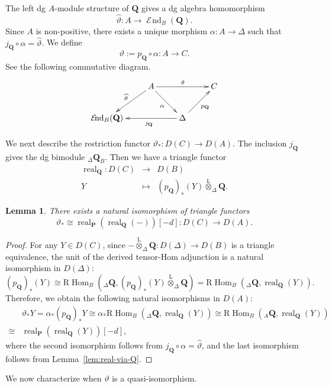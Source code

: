 \documentclass[11pt,a4paper,reqno]{amsart}
\theoremstyle{plain}
\newtheorem{lemma}[theorem]{Lemma}
\numberwithin{equation}{section}
\theoremstyle{definition}
\newcommand{\Hom}{\operatorname{Hom}}
\newcommand{\RHom}{\mathrm R\!\Hom}
\newcommand{\real}{\operatorname{real}}
\newcommand{\Lotimes}{\overset{\mathrm L}{\otimes}}
\DeclareMathOperator{\huaEnd}{\mathcal{E}\!nd}
\newcommand{\PP}{\mathbf{P}}
\newcommand{\QQ}{\mathbf{Q}}
\begin{document}
The left dg $A$-module structure of $\QQ$ gives a dg algebra homomorphism
\[
 \widehat\vartheta\colon A\to\huaEnd_B(\QQ).
\]
Since $A$ is non-positive, there exists a unique morphism $\alpha\colon A\rightarrow\Delta$ such that $j_{\QQ}\circ\alpha=\widehat\vartheta$. We define
\[\vartheta:=p_{\QQ}\circ\alpha\colon A\rightarrow C.\]
See the following commutative diagram.
\[\xymatrix{
  &A\ar[rr]^{\vartheta}\ar[dr]_{\alpha}\ar[dl]_{\widehat\vartheta}&&C\\
  \huaEnd_B(\QQ)&&\Delta\ar[ru]_{p_{\QQ}}\ar[ll]^{\quad j_{\QQ}}
}\]

We next describe the restriction functor $\vartheta_*\colon D(C)\to D(A)$. The inclusion $j_{\QQ}$ gives the dg bimodule ${}_\Delta\QQ_B$. Then we have a triangle functor
\[
\begin{array}{rcl}
  \real_{\QQ}\colon D(C)& \to & D(B)\\
  Y &\mapsto &
      (p_{\QQ})_*(Y)\overset{\mathrm L}{\otimes}_\Delta\QQ.
\end{array}
\]

\begin{lemma}\label{lem:res-varthe}
There exists a natural isomorphism of triangle functors
\[
\vartheta_*\cong\real_{\PP}\left(\real_{\QQ}(-)\right)[-d]\colon D(C)\to D(A).
\]
\end{lemma}

\begin{proof}
For any $Y\in D(C)$, since $-\Lotimes_\Delta\QQ\colon D(\Delta)\to D(B)$ is a triangle equivalence, the unit of the derived tensor-Hom adjunction is a natural isomorphism in $D(\Delta)$:
\[(p_{\QQ})_*(Y)\cong\RHom_B
 \left({}_\Delta\QQ,(p_{\QQ})_*(Y)\overset{\mathrm L}{\otimes}_\Delta\QQ\right)=\RHom_B
 \left({}_\Delta\QQ,\real_{\QQ}(Y)\right).\]
Therefore, we obtain the following natural isomorphisms in $D(A)$:
\[\begin{array}{rl}
  & \vartheta_*Y=\alpha_*(p_{\QQ})_*Y\cong\alpha_*\RHom_B\left({}_\Delta\QQ,\real_{\QQ}(Y)\right)\cong\RHom_B\left({}_A\QQ,\real_{\QQ}(Y)\right)\\
  \cong & \real_{\PP}\left(\real_{\QQ}(Y)\right)[-d],
\end{array}
\]
where the second isomorphism follows from $j_{\QQ}\circ\alpha=\widehat\vartheta$, and the last isomorphism follows from Lemma~\ref{lem:real-via-Q}.
\end{proof}

We now characterize when $\vartheta$ is a quasi-isomorphism.
\end{document}
